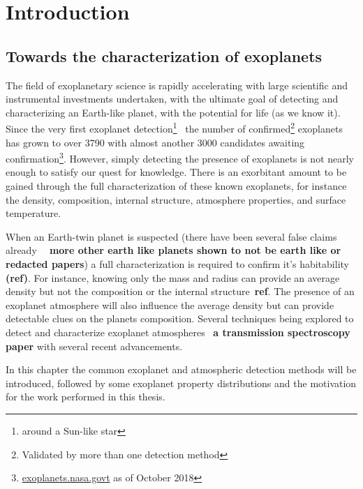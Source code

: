 \chapter{Introduction}\label{cha:introduction}


\section{Towards the characterization of exoplanets}

The field of exoplanetary science is rapidly accelerating with large scientific and instrumental investments undertaken, with the ultimate goal of detecting and characterizing an Earth-like planet, with the potential for life (as we know it).
Since the very first exoplanet detection\footnote{around a Sun-like star}~\citep{mayor_jupitermass_1995} the number of confirmed\footnote{Validated by more than one detection method} exoplanets has grown to over 3790 with almost another 3000 candidates awaiting confirmation\footnote{\href{https://exoplanets.nasa.gov/}{exoplanets.nasa.govt} as of October 2018}.
However, simply detecting the presence of exoplanets is not nearly enough to satisfy our quest for knowledge.
There is an exorbitant amount to be gained through the full characterization of these known exoplanets, for instance the density, composition, internal structure, atmosphere properties, and surface temperature.

When an Earth-twin planet is suspected (there have been several false claims already \textbf{~\citep[e.g.][]{mullally_kepler_2018,}\textbf{ more} other earth like planets shown to not be earth like or redacted papers}) a full characterization is required to confirm it's habitability \textbf{(ref)}.
For instance, knowing only the mass and radius can provide an average density but not the composition or the internal structure~\textbf{ref}\citet{a paper about composition degeneracy}.
The presence of an exoplanet atmosphere will also influence the average density but can provide detectable clues on the planets composition.
Several techniques being explored to detect and characterize exoplanet atmospheres~\citep[e.g.][]{snellen_orbital_2010, martins_reflected_2016, piskorz_evidence_2016, } \textbf{a transmission spectroscopy paper} with several recent advancements.

In this chapter the common exoplanet and atmospheric detection methods will be introduced, followed by some exoplanet property distributions and the motivation for the work performed in this thesis.\\


